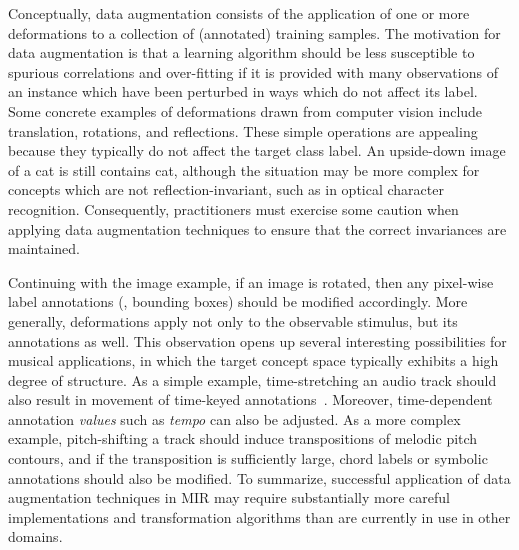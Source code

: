 \documentclass{article}
\begin{document}
Conceptually, data augmentation consists of the application of one or more deformations to
a collection of (annotated) training samples.  
The motivation for data augmentation is that a learning algorithm should be less
susceptible to spurious correlations and over-fitting if it is provided with many
observations of an instance which have been perturbed in ways which do not affect its
label.
Some concrete examples of deformations drawn from computer vision include translation, 
rotations, and reflections.  These simple operations are appealing because they typically 
do not affect the target class label. An upside-down image of a cat is still contains cat, 
although the situation may be more complex for concepts which are not reflection-invariant, 
such as in optical character recognition.  Consequently, practitioners must exercise some 
caution when applying data augmentation techniques to ensure that the correct invariances 
are maintained.

Continuing with the image example, if an image is rotated, then any pixel-wise 
label annotations (\eg, bounding boxes) should be modified accordingly.  
More generally, deformations apply not only to the observable stimulus, 
but its annotations as well.
This observation opens up several interesting possibilities for musical applications, in
which the target concept space typically exhibits a high degree of structure.
As a simple example, time-stretching an audio track should also result in movement of 
time-keyed annotations~\cite{mauch2013audio}.  
Moreover, time-dependent annotation \emph{values} such as \emph{tempo} can also be adjusted.
As a more complex example,
pitch-shifting a track should induce transpositions of melodic pitch contours,
and if the transposition is sufficiently large, chord labels or symbolic annotations
should also be modified.
To summarize, successful application of data augmentation techniques in MIR may require
substantially more careful implementations and transformation algorithms than are currently 
in use in other domains.

\end{document}
